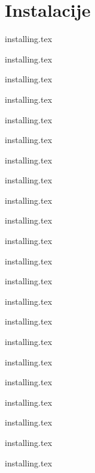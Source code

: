 \section{Instalacije}

{installing.tex}

{installing.tex}

{installing.tex}

{installing.tex}

{installing.tex}

{installing.tex}

{installing.tex}

{installing.tex}

{installing.tex}

{installing.tex}

{installing.tex}

{installing.tex}

{installing.tex}

{installing.tex}

{installing.tex}

{installing.tex}

{installing.tex}

{installing.tex}

{installing.tex}

{installing.tex}

{installing.tex}

{installing.tex}
